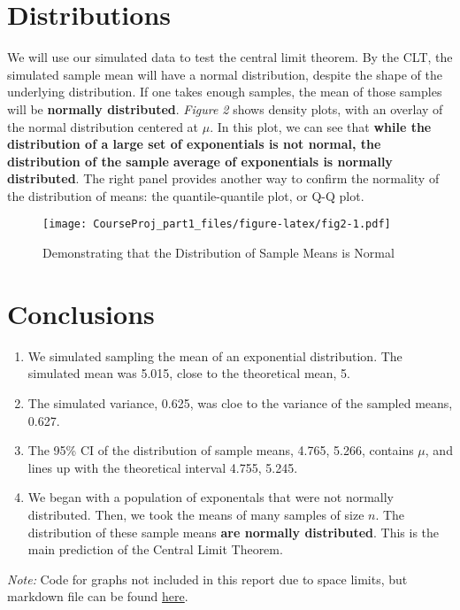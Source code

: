 \documentclass[]{article}
\begin{document}
\section{Distributions}\label{distributions}

We will use our simulated data to test the central limit theorem. By the
CLT, the simulated sample mean will have a normal distribution, despite
the shape of the underlying distribution. If one takes enough samples,
the mean of those samples will be \textbf{normally distributed}.
\emph{Figure 2} shows density plots, with an overlay of the normal
distribution centered at \(\mu\). In this plot, we can see that
\textbf{while the distribution of a large set of exponentials is not
normal, the distribution of the sample average of exponentials is
normally distributed}. The right panel provides another way to confirm
the normality of the distribution of means: the quantile-quantile plot,
or Q-Q plot.

\begin{figure}[htbp]
\centering
\texttt{[image: CourseProj\_part1\_files/figure-latex/fig2-1.pdf]}
\caption{Demonstrating that the Distribution of Sample Means is Normal}
\end{figure}

\pagebreak 

\section{Conclusions}\label{conclusions}

\begin{enumerate}
\def\labelenumi{\arabic{enumi}.}
\itemsep1pt\parskip0pt
\item
  We simulated sampling the mean of an exponential distribution. The
  simulated mean was 5.015, close to the theoretical mean, 5.\\
\item
  The simulated variance, 0.625, was cloe to the variance of the sampled
  means, 0.627.\\
\item
  The 95\% CI of the distribution of sample means, 4.765, 5.266,
  contains \(\mu\), and lines up with the theoretical interval 4.755,
  5.245.\\
\item
  We began with a population of exponentals that were not normally
  distributed. Then, we took the means of many samples of size \(n\).
  The distribution of these sample means \textbf{are normally
  distributed}. This is the main prediction of the Central Limit
  Theorem.
\end{enumerate}

\emph{Note:} Code for graphs not included in this report due to space
limits, but markdown file can be found
\href{https://github.com/anandi42/Stat_Inf/blob/master/StatInf_CP1.Rmd}{here}.
\end{document}
